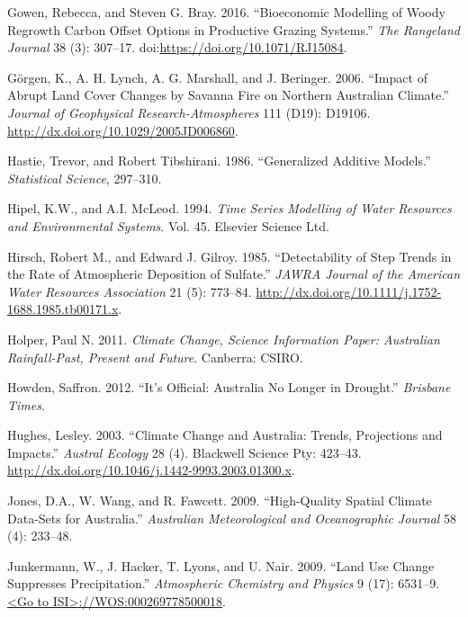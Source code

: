 \documentclass[]{elsarticle} %
\theoremstyle{definition}
\theoremstyle{definition}
\theoremstyle{definition}
\theoremstyle{remark}
\begin{document}
\hypertarget{ref-Gowen2016}{}
Gowen, Rebecca, and Steven G. Bray. 2016. ``Bioeconomic Modelling of
Woody Regrowth Carbon Offset Options in Productive Grazing Systems.''
\emph{The Rangeland Journal} 38 (3): 307--17.
doi:\href{https://doi.org/https://doi.org/10.1071/RJ15084}{https://doi.org/10.1071/RJ15084}.

\hypertarget{ref-Gorgen2006}{}
Görgen, K., A. H. Lynch, A. G. Marshall, and J. Beringer. 2006. ``Impact
of Abrupt Land Cover Changes by Savanna Fire on Northern Australian
Climate.'' \emph{Journal of Geophysical Research-Atmospheres} 111 (D19):
D19106. \url{http://dx.doi.org/10.1029/2005JD006860}.

\hypertarget{ref-Hastie1986}{}
Hastie, Trevor, and Robert Tibshirani. 1986. ``Generalized Additive
Models.'' \emph{Statistical Science}, 297--310.

\hypertarget{ref-Hipel1994}{}
Hipel, K.W., and A.I. McLeod. 1994. \emph{Time Series Modelling of Water
Resources and Environmental Systems}. Vol. 45. Elsevier Science Ltd.

\hypertarget{ref-Hirsch1985}{}
Hirsch, Robert M., and Edward J. Gilroy. 1985. ``Detectability of Step
Trends in the Rate of Atmospheric Deposition of Sulfate.'' \emph{JAWRA
Journal of the American Water Resources Association} 21 (5): 773--84.
\url{http://dx.doi.org/10.1111/j.1752-1688.1985.tb00171.x}.

\hypertarget{ref-Holper2011}{}
Holper, Paul N. 2011. \emph{Climate Change, Science Information Paper:
Australian Rainfall-Past, Present and Future}. Canberra: CSIRO.

\hypertarget{ref-Howden2012}{}
Howden, Saffron. 2012. ``It's Official: Australia No Longer in
Drought.'' \emph{Brisbane Times}.

\hypertarget{ref-Hughes2003}{}
Hughes, Lesley. 2003. ``Climate Change and Australia: Trends,
Projections and Impacts.'' \emph{Austral Ecology} 28 (4). Blackwell
Science Pty: 423--43.
\url{http://dx.doi.org/10.1046/j.1442-9993.2003.01300.x}.

\hypertarget{ref-Jones2009}{}
Jones, D.A., W. Wang, and R. Fawcett. 2009. ``High-Quality Spatial
Climate Data-Sets for Australia.'' \emph{Australian Meteorological and
Oceanographic Journal} 58 (4): 233--48.

\hypertarget{ref-Junkermann2009}{}
Junkermann, W., J. Hacker, T. Lyons, and U. Nair. 2009. ``Land Use
Change Suppresses Precipitation.'' \emph{Atmospheric Chemistry and
Physics} 9 (17): 6531--9.
\href{\%3CGo\%20to\%20ISI\%3E://WOS:000269778500018}{\textless{}Go to ISI\textgreater{}://WOS:000269778500018}.
\end{document}
